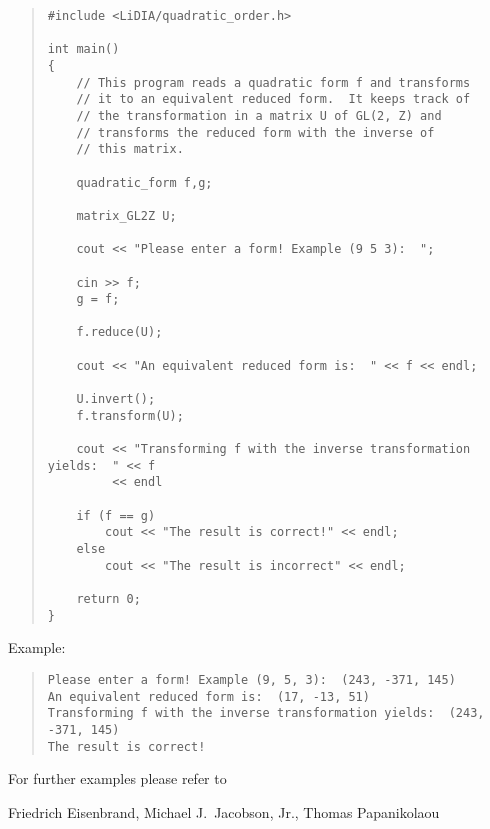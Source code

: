 \begin{quote}
\begin{verbatim}
#include <LiDIA/quadratic_order.h>

int main()
{
    // This program reads a quadratic form f and transforms
    // it to an equivalent reduced form.  It keeps track of
    // the transformation in a matrix U of GL(2, Z) and
    // transforms the reduced form with the inverse of
    // this matrix.

    quadratic_form f,g;

    matrix_GL2Z U;

    cout << "Please enter a form! Example (9 5 3):  ";

    cin >> f;
    g = f;

    f.reduce(U);

    cout << "An equivalent reduced form is:  " << f << endl;

    U.invert();
    f.transform(U);

    cout << "Transforming f with the inverse transformation yields:  " << f
         << endl

    if (f == g)
        cout << "The result is correct!" << endl;
    else
        cout << "The result is incorrect" << endl;

    return 0;
}
\end{verbatim}
\end{quote}

Example:
\begin{quote}
\begin{verbatim}
Please enter a form! Example (9, 5, 3):  (243, -371, 145)
An equivalent reduced form is:  (17, -13, 51)
Transforming f with the inverse transformation yields:  (243, -371, 145)
The result is correct!
\end{verbatim}
\end{quote}

For further examples please refer to



\AUTHOR

Friedrich Eisenbrand, Michael J.~Jacobson, Jr., Thomas Papanikolaou

